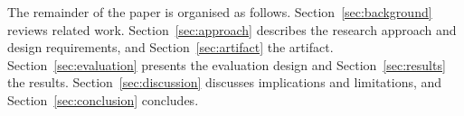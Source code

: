 The remainder of the paper is organised as follows. Section~\ref{sec:background} reviews related work. Section~\ref{sec:approach} describes the research approach and design requirements, and Section~\ref{sec:artifact} the artifact. Section~\ref{sec:evaluation} presents the evaluation design and Section~\ref{sec:results} the results. Section~\ref{sec:discussion} discusses implications and limitations, and Section~\ref{sec:conclusion} concludes.

